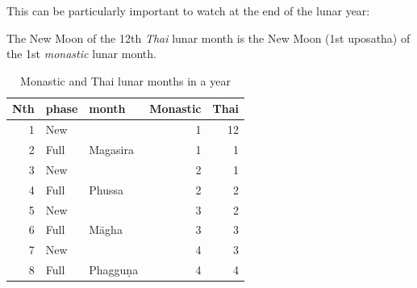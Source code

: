 \documentclass[11pt,oneside]{memoir-article}
\begin{document}
This can be particularly important to watch at the end of the lunar year:

The New Moon of the 12th \emph{Thai} lunar month is the New Moon (1st uposatha) of
the 1st \emph{monastic} lunar month.

\begin{table}[h]
\caption{\label{monastic-thai-year} Monastic and Thai lunar months in a year}
\centering
\begin{tabular}{rllrr}
Nth & phase & month & Monastic & Thai\\
\hline
1 & New &  & 1 & 12\\
2 & Full & Magasira & 1 & 1\\
3 & New &  & 2 & 1\\
4 & Full & Phussa & 2 & 2\\
5 & New &  & 3 & 2\\
6 & Full & Māgha & 3 & 3\\
7 & New &  & 4 & 3\\
8 & Full & Phagguṇa & 4 & 4\\
\end{tabular}
\end{table}
\end{document}

